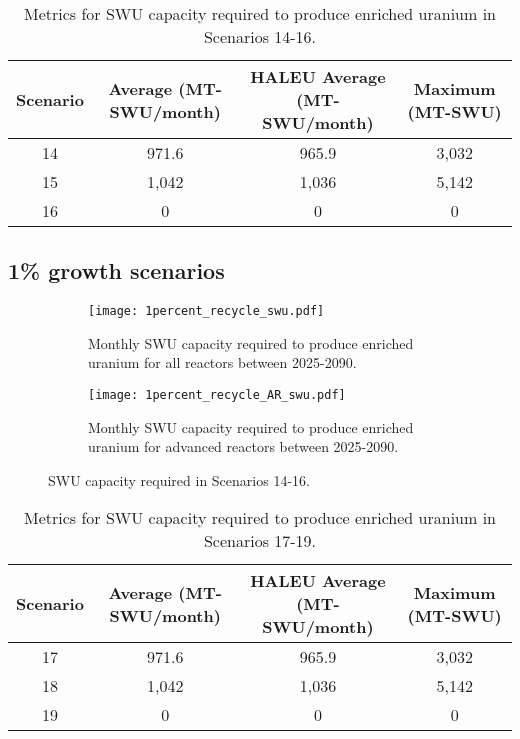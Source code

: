 \begin{table}[h!]
    \centering 
    \caption{Metrics for \gls{SWU} capacity required to produce 
    enriched uranium in Scenarios 14-16.}
    \label{tab:s14-16_swu}
    \begin{tabular}{c c c c}
        \hline 
        Scenario & Average (MT-SWU/month) & HALEU Average (MT-SWU/month)
         & Maximum (MT-SWU) \\
        \hline 
        14 & 971.6 & 965.9 & 3,032 \\
        15 & 1,042 & 1,036 & 5,142 \\
        16 & 0 & 0 & 0 \\
        \hline
        
    \end{tabular}
\end{table}

\subsection{1\% growth scenarios}

\begin{figure}[h!]
    \centering
    \begin{subfigure}[b]{0.45\textwidth}
        \centering
        \texttt{[image: 1percent\_recycle\_swu.pdf]}
        \caption{Monthly SWU capacity required to produce 
        enriched uranium for all reactors between 2025-2090.}
        \label{fig:1percent_recycle_swu_all}
    \end{subfigure}
    \hfill
    \begin{subfigure}[b]{0.45\textwidth}
        \centering
        \texttt{[image: 1percent\_recycle\_AR\_swu.pdf]}
        \caption{Monthly SWU capacity required to produce 
        enriched uranium for advanced reactors between 2025-2090.}
        \label{fig:1percent_recycle_swu_AR}
    \end{subfigure}
       \caption{\gls{SWU} capacity required in Scenarios 14-16.}
       \label{fig:1percent_recycle_swu}
\end{figure}

\begin{table}[h!]
    \centering 
    \caption{Metrics for \gls{SWU} capacity required to produce 
    enriched uranium in Scenarios 17-19.}
    \label{tab:s14-16_swu}
    \begin{tabular}{c c c c}
        \hline 
        Scenario & Average (MT-SWU/month) & HALEU Average (MT-SWU/month)
         & Maximum (MT-SWU) \\
        \hline 
        17 & 971.6 & 965.9 & 3,032 \\
        18 & 1,042 & 1,036 & 5,142 \\
        19 & 0 & 0 & 0 \\
        \hline
        
    \end{tabular}
\end{table}

